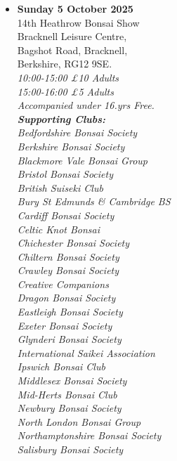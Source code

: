 \begin{itemize}
    \item \textbf{Sunday 5 October 2025}
    \\
    14th Heathrow Bonsai Show \\
    Bracknell Leisure Centre, \\
    Bagshot Road, Bracknell, \\
    Berkshire, RG12 9SE.
    \\
    \emph{10:00-15:00 £10 Adults} \\
    \emph{15:00-16:00 £5 Adults} \\
    \emph{Accompanied under 16.yrs Free.} \\
    \emph{\textbf{Supporting Clubs:}} \\
    \emph{Bedfordshire Bonsai Society} \\
    \emph{Berkshire Bonsai Society} \\
    \emph{Blackmore Vale Bonsai Group} \\
    \emph{Bristol Bonsai Society} \\
    \emph{British Suiseki Club} \\
    \emph{Bury St Edmunds \& Cambridge BS} \\
    \emph{Cardiff Bonsai Society} \\
    \emph{Celtic Knot Bonsai} \\
    \emph{Chichester Bonsai Society} \\
    \emph{Chiltern Bonsai Society} \\
    \emph{Crawley Bonsai Society} \\
    \emph{Creative Companions} \\
    \emph{Dragon Bonsai Society} \\
    \emph{Eastleigh Bonsai Society} \\
    \emph{Exeter Bonsai Society} \\
    \emph{Glynderi Bonsai Society} \\
    \emph{International Saikei Association} \\
    \emph{Ipswich Bonsai Club} \\
    \emph{Middlesex Bonsai Society} \\
    \emph{Mid-Herts Bonsai Club} \\
    \emph{Newbury Bonsai Society} \\
    \emph{North London Bonsai Group} \\
    \emph{Northamptonshire Bonsai Society} \\
    \emph{Salisbury Bonsai Society} \\

\end{itemize}
